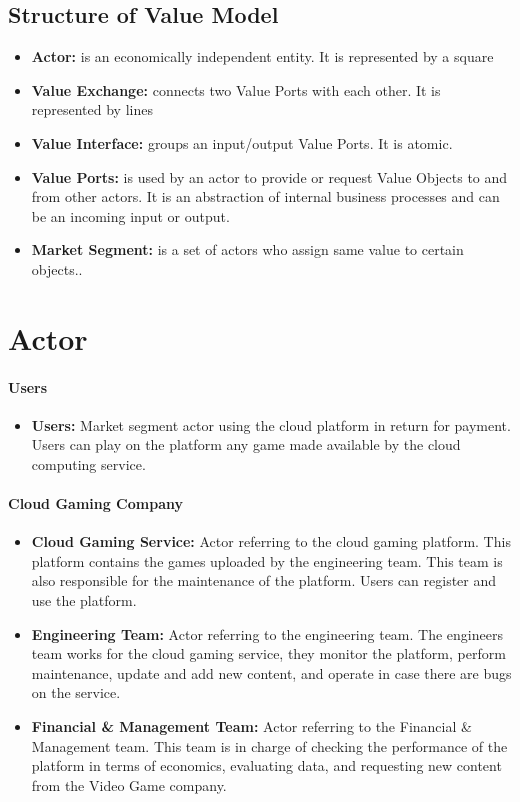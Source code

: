 \documentclass[a4paper,12pt]{report}
\begin{document}
\subsection{Structure of Value Model}
\begin{itemize}
\item{\textbf{Actor:} is an economically independent entity. It is represented by a square}
\item{\textbf{Value Exchange:} connects two Value Ports with each other. It is represented by lines}
\item{\textbf{Value Interface:} groups an input/output Value Ports. It is atomic.}
\item{\textbf{Value Ports:} is used by an actor to provide or request Value Objects to and from other
actors. It is an abstraction of internal business processes and can be an incoming input or output.}
\item{\textbf{Market Segment:} is a set of actors who assign same value to certain objects..}
\end{itemize}
%
%
\newpage
\section{Actor}
\paragraph*{Users}
\begin{itemize}
\item{\textbf{Users:} Market segment actor using the cloud platform in return for payment.
Users can play on the platform any game made available by the cloud computing service.} 
%
\end{itemize}
%
%
\paragraph*{Cloud Gaming Company}
\begin{itemize}
\item{\textbf{Cloud Gaming Service:} Actor referring to the cloud gaming platform.
This platform contains the games uploaded by the engineering team. This team is also responsible for the maintenance of the platform. Users can register and use the platform. } 
%
\item{\textbf{Engineering Team:}  Actor referring to the engineering team.
The engineers team works for the cloud gaming service, they monitor the platform, perform maintenance, update and add new content, and operate in case there are bugs on the service. } 
%
\item{\textbf{Financial \& Management Team:}  Actor referring to the Financial \& Management team.
This team is in charge of checking the performance of the platform in terms of economics, evaluating data, and requesting new content from the Video Game company. } 
%
\end{itemize}
%
%
\end{document}
